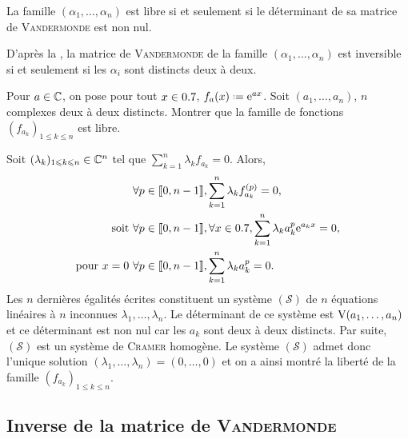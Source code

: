 \begin{corol}
    La famille $(\alpha_1, \dots, \alpha_n)$ est libre si et seulement si le déterminant de sa matrice de \textsc{Vandermonde} est non nul.
\end{corol}

\begin{preuve} 
    D'après la , la matrice de \textsc{Vandermonde} de la famille $(\alpha_1, \dots, \alpha_n)$ est inversible si et seulement si les $\alpha_i$ sont distincts deux à deux. 
\end{preuve}

\begin{exercice}
    Pour $a \in \mathbb{C}$, on pose pour tout $x \in 0.7$, $f_a(x) \defeq \me^{ax}$. Soit $(a_1, \dots, a_n)$, $n$ complexes deux à deux distincts. Montrer que la famille de fonctions $(f_{a_k})_{1 \leqslant k \leqslant n}$ est libre.
\end{exercice}

\begin{solution}
    \item Soit $(\lambda_k)_{1 \leqslant k \leqslant n} \in \mathbb{C}^n$ tel que $\sum\limits_{k=1}^n \lambda_k f_{a_k} = 0$. Alors, 
    \begin{align*}
        & \forall p \in \llbracket 0, n-1 \rrbracket, \sum_{k=1}^n \lambda_k f^{(p)}_{a_k} = 0, \\
        \text{soit } & \forall p \in \llbracket 0, n-1 \rrbracket, \forall x \in 0.7, \sum_{k=1}^n \lambda_k a_k^p \mathrm{e}^{a_k x} = 0, \\
        \text{pour $x=0$ } & \forall p \in \llbracket 0, n-1 \rrbracket, \sum_{k=1}^n \lambda_k a_k^p = 0.
    \end{align*}
    Les $n$ dernières égalités écrites constituent un système $(\mathscr{S})$ de $n$ équations linéaires à $n$ inconnues $\lambda_1, \dots, \lambda_n$. Le déterminant de ce système est $\mathrm{V}(a_1, \dots, a_n)$ et ce déterminant est non nul car les $a_k$ sont deux à deux distincts. Par suite, $(\mathscr{S})$ est un système de \textsc{Cramer} homogène. Le système $(\mathscr{S})$ admet donc l'unique solution $(\lambda_1, \dots, \lambda_n) = (0, \dots, 0)$ et on a ainsi montré la liberté de la famille $(f_{a_k})_{1 \leqslant k \leqslant n}$.
\end{solution}

\subsection{Inverse de la matrice de {\textsc{Vandermonde}}}

